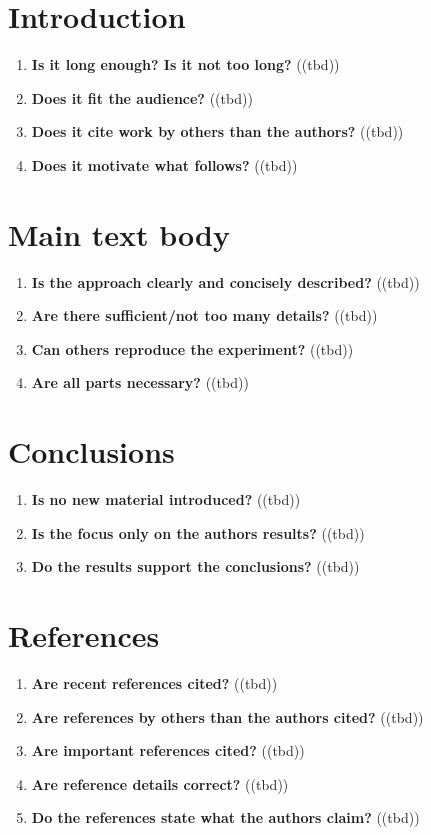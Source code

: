 \section{Introduction}\label{sec:introduction}
\begin{enumerate}[resume]
    \item \textbf{Is it long enough? Is it not too long?} ((tbd))
    \item \textbf{Does it fit the audience?} ((tbd))
    \item \textbf{Does it cite work by others than the authors?} ((tbd))
    \item \textbf{Does it motivate what follows?} ((tbd))
\end{enumerate}

\section{Main text body}\label{sec:main}
\begin{enumerate}[resume]
    \item \textbf{Is the approach clearly and concisely described?} ((tbd))
    \item \textbf{Are there sufficient/not too many details?} ((tbd))
    \item \textbf{Can others reproduce the experiment?} ((tbd))
    \item \textbf{Are all parts necessary?} ((tbd))
\end{enumerate}

\section{Conclusions}\label{sec:conclusions}
\begin{enumerate}[resume]
    \item \textbf{Is no new material introduced?} ((tbd))
    \item \textbf{Is the focus only on the authors results?} ((tbd))
    \item \textbf{Do the results support the conclusions?} ((tbd))
\end{enumerate}

\section{References}\label{sec:references}
\begin{enumerate}[resume]
    \item \textbf{Are recent references cited?} ((tbd))
    \item \textbf{Are references by others than the authors cited?} ((tbd))
    \item \textbf{Are important references cited?} ((tbd))
    \item \textbf{Are reference details correct?} ((tbd))
    \item \textbf{Do the references state what the authors claim?} ((tbd))
\end{enumerate}

